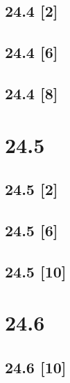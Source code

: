 \documentclass{article}
\begin{document}
\subsection*{24.4 [2]}
\subsection*{24.4 [6]}
\subsection*{24.4 [8]}

\newpage

\section*{24.5}
\setcounter{equation}{0}

\subsection*{24.5 [2]}
\subsection*{24.5 [6]}
\subsection*{24.5 [10]}

\newpage

\section*{24.6}
\setcounter{equation}{0}

\subsection*{24.6 [10]}
\end{document}
